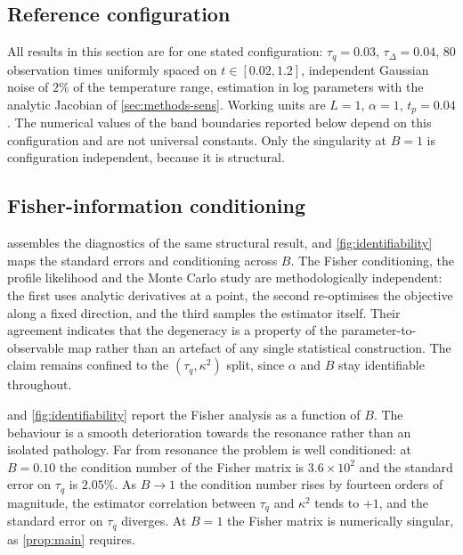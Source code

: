 \documentclass[preprint,12pt,a4paper]{elsarticle}
\theoremstyle{plain}
\theoremstyle{definition}
\theoremstyle{remark}
\newcommand{\tq}{\tau_{q}}
\newcommand{\kk}{\kappa^{2}}
\newcommand{\Bnum}{B}
\begin{document}
\subsection{Reference configuration}
\label{sec:prac-config}

All results in this section are for one stated configuration: $\tq = 0.03$,
$\tau_{\Delta} = 0.04$, $80$ observation times uniformly spaced on
$t \in [0.02, 1.2]$, independent Gaussian noise of $2\%$ of the temperature
range, estimation in log parameters with the analytic Jacobian of
\cref{sec:methods-sens}. Working units are $L=1$, $\alpha=1$, $t_{p}=0.04$.
The numerical values of the band boundaries reported below depend on this
configuration and are not universal constants. Only the singularity at
$\Bnum = 1$ is configuration independent, because it is structural.

\subsection{Fisher-information conditioning}
\label{sec:prac-landscape}

 assembles the diagnostics of the same structural
result, and \cref{fig:identifiability} maps the standard errors and
conditioning across $\Bnum$. The Fisher conditioning, the profile likelihood
and the Monte Carlo study are methodologically independent: the first uses
analytic derivatives at a point, the second re-optimises the objective along a
fixed direction, and the third samples the estimator itself. Their agreement
indicates that the degeneracy is a property of the parameter-to-observable map
rather than an artefact of any single statistical construction. The claim
remains confined to the $(\tq,\kk)$ split, since $\alpha$ and $\Bnum$ stay
identifiable throughout.

 and \cref{fig:identifiability} report the Fisher
analysis as a function of $\Bnum$. The behaviour is a smooth deterioration towards the resonance rather
than an isolated pathology. Far from resonance the problem is well conditioned:
at $\Bnum = 0.10$ the condition number of the Fisher matrix is $3.6\times10^{2}$
and the standard error on $\tq$ is $2.05\%$. As $\Bnum \to 1$ the condition
number rises by fourteen orders of magnitude, the estimator correlation between
$\tq$ and $\kk$ tends to $+1$, and the standard error on $\tq$ diverges. At
$\Bnum = 1$ the Fisher matrix is numerically singular, as \cref{prop:main}
requires.
\end{document}
